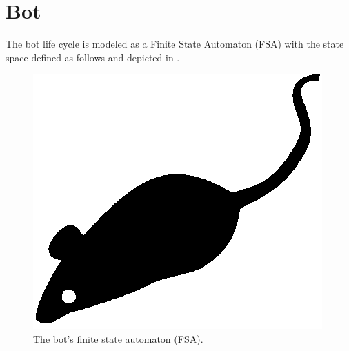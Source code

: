 \section{Bot}
\label{sec:bot}

The bot life cycle is modeled as a Finite State Automaton (FSA) with the state space defined as follows and depicted in .

\begin{figure}[tp]
  \centering
  \includegraphics{./fig/acmlarge-mouse}
  \caption{The bot's finite state automaton (FSA).}
    \label{fig:bot-fsa}
\end{figure}

